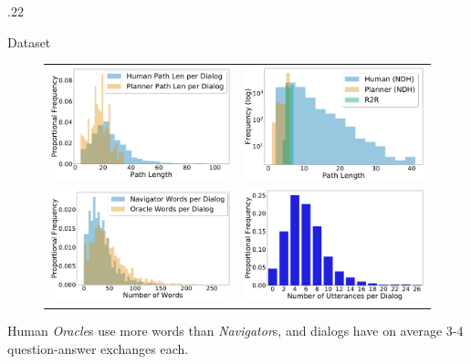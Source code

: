 \documentclass[final]{beamer}
\newcommand{\setblocksize}{\LARGE \centering}
\newcommand{\sidecolumnwidth}{.22}
\newcommand{\nav}{\textit{Navigator}}
\newcommand{\ora}{\textit{Oracle}}
\begin{document}
\begin{frame}{}
\begin{columns}[t]
\begin{column}{\sidecolumnwidth\linewidth}
\begin{block}{\setblocksize Dataset}
{\begin{figure}[ht]
\begin{tabular}{cc}
    \includegraphics[width=0.45\columnwidth]{figures/player_planner_steps_per_dialog.pdf} &
    \includegraphics[width=0.45\columnwidth]{figures/path_len_per_ndh.pdf} \\
    \includegraphics[width=0.45\columnwidth]{figures/nav_ora_words_per_dialog.pdf} &
    \includegraphics[width=0.45\columnwidth]{figures/utterances_per_dialog.pdf}
\end{tabular}
\vspace{-4mm}
\end{figure}

Human \ora{}s use more words than \nav{}s, and dialogs have on average 3-4 question-answer exchanges each.

}
\end{block}
\end{column}
\end{columns}
\end{frame}
\end{document}
